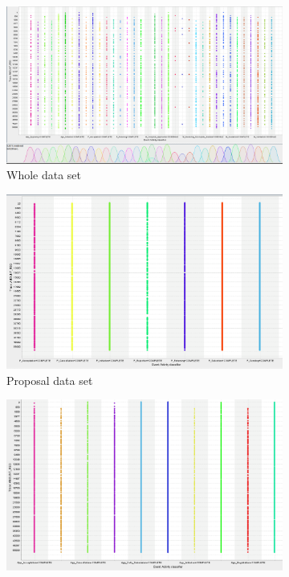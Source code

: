 \begin{figure}[!htbp]
\centering
\begin{subfigure}{0.49\textwidth}
\includegraphics[width = 0.99\linewidth]{AmountRequ_All.PNG}
\caption{Whole data set}
\label{fig:AmounWhole}
\end{subfigure}
\begin{subfigure}{0.49\textwidth}
\includegraphics[width = 0.99\linewidth]{AmountRequ_P.PNG}
\caption{Proposal data set}
\label{fig:AmounP}
\end{subfigure}
\begin{subfigure}{0.49\textwidth}
\includegraphics[width = 0.99\linewidth]{AmountRequ_App.PNG}

\end{subfigure}
\end{figure}
